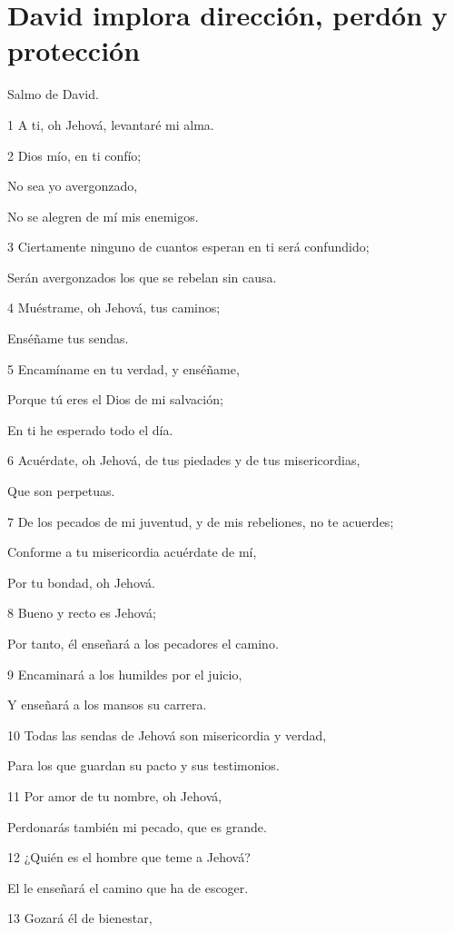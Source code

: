 \section*{David implora dirección, perdón y protección}

\par Salmo de David.

\par 1 A ti, oh Jehová, levantaré mi alma.
\par 2 Dios mío, en ti confío;
\par No sea yo avergonzado,
\par No se alegren de mí mis enemigos.
\par 3 Ciertamente ninguno de cuantos esperan en ti será confundido;
\par Serán avergonzados los que se rebelan sin causa.
\par 4 Muéstrame, oh Jehová, tus caminos;
\par Enséñame tus sendas.
\par 5 Encamíname en tu verdad, y enséñame,
\par Porque tú eres el Dios de mi salvación;
\par En ti he esperado todo el día.
\par 6 Acuérdate, oh Jehová, de tus piedades y de tus misericordias,
\par Que son perpetuas.
\par 7 De los pecados de mi juventud, y de mis rebeliones, no te acuerdes;
\par Conforme a tu misericordia acuérdate de mí,
\par Por tu bondad, oh Jehová.
\par 8 Bueno y recto es Jehová;
\par Por tanto, él enseñará a los pecadores el camino.
\par 9 Encaminará a los humildes por el juicio,
\par Y enseñará a los mansos su carrera.
\par 10 Todas las sendas de Jehová son misericordia y verdad,
\par Para los que guardan su pacto y sus testimonios.
\par 11 Por amor de tu nombre, oh Jehová,
\par Perdonarás también mi pecado, que es grande.
\par 12 ¿Quién es el hombre que teme a Jehová?
\par El le enseñará el camino que ha de escoger.
\par 13 Gozará él de bienestar,
